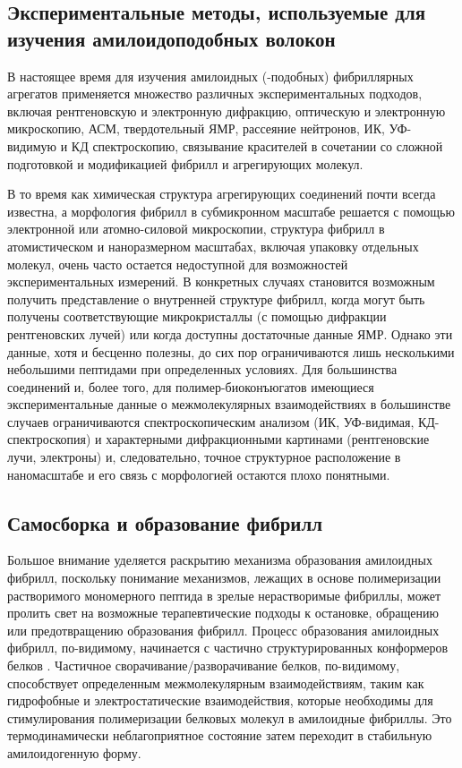 \subsection{Экспериментальные методы, используемые для изучения амилоидоподобных волокон}

    В настоящее время для изучения амилоидных (-подобных) фибриллярных агрегатов применяется множество различных экспериментальных подходов, включая рентгеновскую и электронную дифракцию, оптическую и электронную микроскопию, АСМ, твердотельный ЯМР, рассеяние нейтронов, ИК, УФ-видимую и КД спектроскопию, связывание красителей в сочетании со сложной подготовкой и модификацией фибрилл и агрегирующих молекул.
    
    В то время как химическая структура агрегирующих соединений почти всегда известна, а морфология фибрилл в субмикронном масштабе решается с помощью электронной или атомно-силовой микроскопии, структура фибрилл в атомистическом и наноразмерном масштабах, включая упаковку отдельных молекул, очень часто остается недоступной для возможностей экспериментальных измерений. В конкретных случаях становится возможным получить представление о внутренней структуре фибрилл, когда могут быть получены соответствующие микрокристаллы (с помощью дифракции рентгеновских лучей) или когда доступны достаточные данные ЯМР. Однако эти данные, хотя и бесценно полезны, до сих пор ограничиваются лишь несколькими небольшими пептидами при определенных условиях. Для большинства соединений и, более того, для полимер-биоконъюгатов имеющиеся экспериментальные данные о межмолекулярных взаимодействиях в большинстве случаев ограничиваются спектроскопическим анализом (ИК, УФ-видимая, КД-спектроскопия) и характерными дифракционными картинами (рентгеновские лучи, электроны) и, следовательно, точное структурное расположение в наномасштабе и его связь с морфологией остаются плохо понятными.
    
\subsection{Самосборка и образование фибрилл}

    Большое внимание уделяется раскрытию механизма образования амилоидных фибрилл, поскольку понимание механизмов, лежащих в основе полимеризации растворимого мономерного пептида в зрелые нерастворимые фибриллы, может пролить свет на возможные терапевтические подходы к остановке, обращению или предотвращению образования фибрилл. Процесс образования амилоидных фибрилл, по-видимому, начинается с частично структурированных конформеров белков \cite{uversky_conformational_2004,kelly_alternative_1998}. Частичное сворачивание/разворачивание белков, по-видимому, способствует определенным межмолекулярным взаимодействиям, таким как гидрофобные и электростатические взаимодействия, которые необходимы для стимулирования полимеризации белковых молекул в амилоидные фибриллы. Это термодинамически неблагоприятное состояние затем переходит в стабильную амилоидогенную форму.
    
